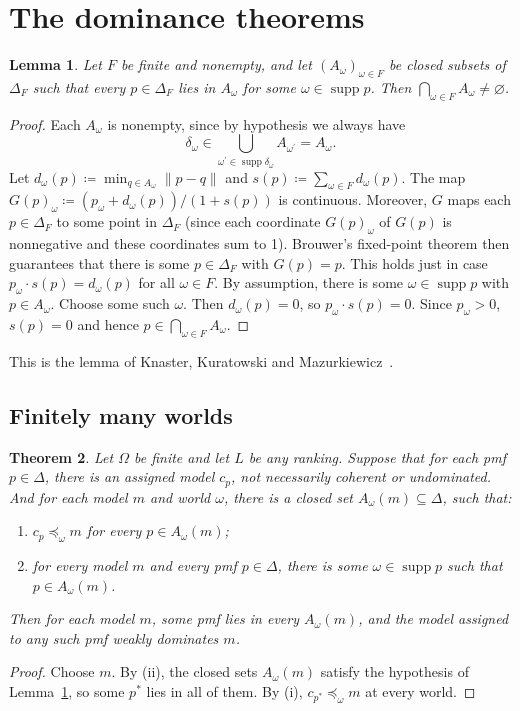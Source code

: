 \documentclass[11pt]{article}
\newtheorem{theorem}{Theorem}[section]
\newtheorem{lemma}[theorem]{Lemma}
\theoremstyle{definition}
\newcommand{\supp}{\operatorname{supp}}
\begin{document}
\section{The dominance theorems}\label{sec:general}

\begin{lemma}\label{lem:kkm}
Let $F$ be finite and nonempty, and let $(A_\omega)_{\omega\in F}$ be closed subsets of $\Delta_F$ such that every $p\in\Delta_F$ lies in $A_\omega$ for some $\omega\in\supp p$. Then $\bigcap_{\omega\in F}A_\omega\ne\varnothing$.
\end{lemma}
\begin{proof}
Each $A_\omega$ is nonempty, since by hypothesis we always have 
\[
\delta_\omega\in\bigcup_{\omega^\prime\in\supp \delta_\omega}A_{\omega^\prime}=A_\omega.
\]
Let $d_\omega(p)\coloneqq\min_{q\in A_\omega}\lVert p-q \rVert$ and $s(p)\coloneqq\sum_{\omega\in F} d_\omega(p)$. The map $G(p)_\omega\coloneqq(p_\omega+d_\omega(p))/(1+s(p))$ is continuous. Moreover, $G$ maps each $p\in\Delta_F$ to some point in $\Delta_F$ (since each coordinate $G(p)_\omega$ of $G(p)$ is nonnegative and these coordinates sum to 1). Brouwer's fixed-point theorem then guarantees that there is some $p\in\Delta_F$ with $G(p)=p$. This holds just in case $p_\omega\cdot s(p)=d_\omega(p)$ for all $\omega\in F$. By assumption, there is some $\omega\in\supp p$ with $p\in A_\omega$. Choose some such $\omega$. Then $d_\omega(p)=0$, so $p_\omega\cdot s(p)=0$. Since $p_\omega>0$, $s(p)=0$ and hence $p\in\bigcap_{\omega\in F}A_\omega$.
\end{proof}

This is the lemma of Knaster, Kuratowski and Mazurkiewicz~\cite{KKM}.




\subsection{Finitely many worlds}
\begin{theorem}\label{thm:finite}
Let $\Omega$ be finite and let $L$ be any ranking. Suppose that for each pmf $p\in\Delta$, there is an assigned model $c_p$, not necessarily coherent or undominated. And for each model $m$ and world $\omega$, there is a closed set $A_\omega(m)\subseteq\Delta$, such that:
\begin{enumerate}[label=(\roman*)]
\item $c_p\preceq_\omega m$ for every $p\in A_\omega(m)$;
\item for every model $m$ and every pmf $p\in\Delta$, there is some $\omega\in\supp p$ such that $p\in A_\omega(m)$.
\end{enumerate}
Then for each model $m$, some pmf lies in every $A_\omega(m)$, and the model assigned to any such pmf weakly dominates $m$.
\end{theorem}
\begin{proof}
Choose $m$. By (ii), the closed sets $A_\omega(m)$ satisfy the hypothesis of Lemma~\ref{lem:kkm}, so some $p^*$ lies in all of them. By (i), $c_{p^*}\preceq_\omega m$ at every world.
\end{proof}
\end{document}
